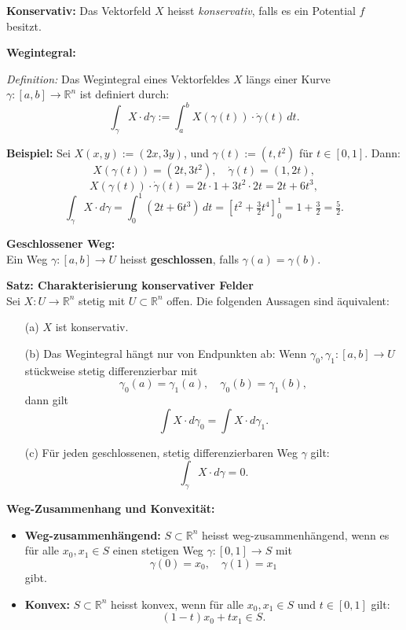 \textbf{Konservativ:} Das Vektorfeld \( X \) heisst \emph{konservativ}, falls es ein Potential \( f \) besitzt.

\textbf{Wegintegral:}

\textit{Definition:} Das Wegintegral eines Vektorfeldes \( X \) längs einer Kurve \( \gamma: [a, b] \to \mathbb{R}^n \) ist definiert durch:
\[
\int_\gamma X \cdot d\gamma := \int_a^b X(\gamma(t)) \cdot \dot{\gamma}(t) \, dt.
\]

\textbf{Beispiel:} Sei \( X(x, y) := (2x, 3y) \), und \(\gamma(t) := (t, t^2) \) für \( t \in [0, 1] \). Dann:
\[
X(\gamma(t)) = (2t, 3t^2), \quad \dot{\gamma}(t) = (1, 2t),
\]
\[
X(\gamma(t)) \cdot \dot{\gamma}(t) = 2t \cdot 1 + 3t^2 \cdot 2t = 2t + 6t^3,
\]
\[
\int_\gamma X \cdot d\gamma = \int_0^1 (2t + 6t^3) \, dt = \left[t^2 + \tfrac{3}{2}t^4\right]_0^1 = 1 + \tfrac{3}{2} = \tfrac{5}{2}.
\]


\textbf{Geschlossener Weg:} \\
Ein Weg \( \gamma : [a, b] \to U \) heisst \textbf{geschlossen}, falls \( \gamma(a) = \gamma(b) \).

\vspace{0.5em}
\textbf{Satz: Charakterisierung konservativer Felder} \\
Sei \( X : U \to \mathbb{R}^n \) stetig mit \( U \subset \mathbb{R}^n \) offen. Die folgenden Aussagen sind äquivalent:

\begin{itemize}
  \item[(a)] \( X \) ist konservativ.
  \item[(b)] Das Wegintegral hängt nur von Endpunkten ab: Wenn \(\gamma_0, \gamma_1: [a,b] \to U\) stückweise stetig differenzierbar mit
  \[
    \gamma_0(a) = \gamma_1(a), \quad \gamma_0(b) = \gamma_1(b),
  \]
  dann gilt
  \[
    \int X \cdot d\gamma_0 = \int X \cdot d\gamma_1.
  \]
  \item[(c)] Für jeden geschlossenen, stetig differenzierbaren Weg \( \gamma \) gilt:
  \[
    \int_\gamma X \cdot d\gamma = 0.
  \]
\end{itemize}


\textbf{Weg-Zusammenhang und Konvexität:}

\begin{itemize}
  \item \textbf{Weg-zusammenhängend:} \( S \subset \mathbb{R}^n \) heisst weg-zusammenhängend, wenn es für alle \( x_0, x_1 \in S \) einen stetigen Weg \( \gamma: [0,1] \to S \) mit
  \[
    \gamma(0) = x_0, \quad \gamma(1) = x_1
  \]
  gibt.
  
  \item \textbf{Konvex:} \( S \subset \mathbb{R}^n \) heisst konvex, wenn für alle \( x_0, x_1 \in S \) und \( t \in [0,1] \) gilt:
  \[
    (1 - t)x_0 + tx_1 \in S.
  \]
\end{itemize}

